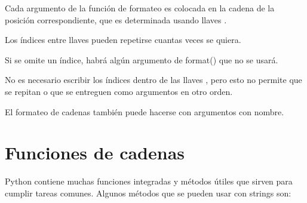 \documentclass{report}
\begin{document}
Cada argumento de la función de formateo es colocada en la cadena de la posición correspondiente, que es determinada usando llaves {}.

Los índices entre llaves {} pueden repetirse cuantas veces se quiera.


Si se omite un índice, habrá algún argumento de format() que no se usará.


No es necesario escribir los índices dentro de las llaves {}, pero esto no permite que se repitan o que se entreguen como argumentos en otro orden.


El formateo de cadenas también puede hacerse con argumentos con nombre.


\section{Funciones de cadenas}

Python contiene muchas funciones integradas y métodos útiles que sirven para cumplir tareas comunes. Algunos métodos que se pueden usar con strings son:
\end{document}
